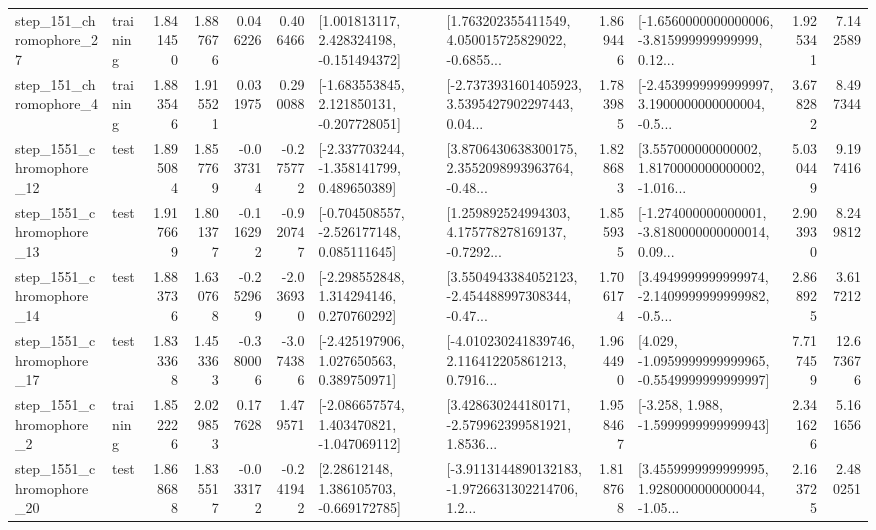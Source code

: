\begin{tabular}{llrrrrllrlrr}
  step\_151\_chromophore\_27 &  training &      1.841450 &    1.887676 &      0.046226 &  0.406466 &    [1.001813117, 2.428324198, -0.151494372] &  [1.763202355411549, 4.050015725829022, -0.6855... &       1.869446 &  [-1.6560000000000006, -3.815999999999999, 0.12... &            1.925341 &          7.142589 \\
   step\_151\_chromophore\_4 &  training &      1.883546 &    1.915521 &      0.031975 &  0.290088 &   [-1.683553845, 2.121850131, -0.207728051] &  [-2.7373931601405923, 3.5395427902297443, 0.04... &       1.783985 &  [-2.4539999999999997, 3.1900000000000004, -0.5... &            3.678282 &          8.497344 \\
 step\_1551\_chromophore\_12 &      test &      1.895084 &    1.857769 &     -0.037314 & -0.275772 &   [-2.337703244, -1.358141799, 0.489650389] &  [3.8706430638300175, 2.3552098993963764, -0.48... &       1.828683 &  [3.557000000000002, 1.8170000000000002, -1.016... &            5.030449 &          9.197416 \\
 step\_1551\_chromophore\_13 &      test &      1.917669 &    1.801377 &     -0.116292 & -0.920747 &   [-0.704508557, -2.526177148, 0.085111645] &  [1.259892524994303, 4.175778278169137, -0.7292... &       1.855935 &  [-1.274000000000001, -3.8180000000000014, 0.09... &            2.903930 &          8.249812 \\
 step\_1551\_chromophore\_14 &      test &      1.883736 &    1.630768 &     -0.252969 & -2.036930 &    [-2.298552848, 1.314294146, 0.270760292] &  [3.5504943384052123, -2.454488997308344, -0.47... &       1.706174 &  [3.4949999999999974, -2.1409999999999982, -0.5... &            2.868925 &          3.617212 \\
 step\_1551\_chromophore\_17 &      test &      1.833368 &    1.453363 &     -0.380006 & -3.074386 &    [-2.425197906, 1.027650563, 0.389750971] &  [-4.010230241839746, 2.116412205861213, 0.7916... &       1.964490 &  [4.029, -1.0959999999999965, -0.5549999999999997] &            7.717459 &         12.673676 \\
  step\_1551\_chromophore\_2 &  training &      1.852226 &    2.029853 &      0.177628 &  1.479571 &   [-2.086657574, 1.403470821, -1.047069112] &  [3.428630244180171, -2.579962399581921, 1.8536... &       1.958467 &               [-3.258, 1.988, -1.5999999999999943] &            2.341626 &          5.161656 \\
 step\_1551\_chromophore\_20 &      test &      1.868688 &    1.835517 &     -0.033172 & -0.241942 &     [2.28612148, 1.386105703, -0.669172785] &  [-3.9113144890132183, -1.9726631302214706, 1.2... &       1.818768 &  [3.4559999999999995, 1.9280000000000044, -1.05... &            2.163725 &          2.480251 \\

\end{tabular}
